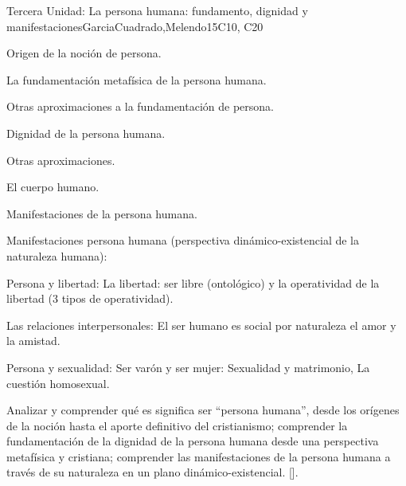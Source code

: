 \begin{syllabus}
\begin{unit}{}{Tercera Unidad: La persona humana: fundamento, dignidad y manifestaciones}{GarciaCuadrado,Melendo}{15}{C10, C20}
\begin{topics}
	\item Origen de la noción de persona.
	\item La fundamentación metafísica de la persona humana.
	\item Otras aproximaciones a la fundamentación de persona.
	\item Dignidad de la persona humana.
		\begin{subtopics}
			\item Otras aproximaciones.
		\end{subtopics}
	\item El cuerpo humano.
	\item Manifestaciones de la persona humana.
	\item Manifestaciones persona humana (perspectiva dinámico-existencial de la naturaleza humana):
		\begin{subtopics}
			\item Persona y libertad:  La libertad: ser libre (ontológico) y la operatividad de la libertad (3 tipos de operatividad).
			\item Las relaciones interpersonales: El ser humano es social por naturaleza el amor y la amistad.
			\item Persona y sexualidad: Ser varón y ser mujer: Sexualidad y matrimonio, La cuestión homosexual.
		\end{subtopics}
\end{topics}
\begin{learningoutcomes}
	\item Analizar y comprender qué es significa ser ``persona humana'', desde los orígenes de la noción hasta el aporte definitivo del cristianismo; comprender la fundamentación de la dignidad de la persona humana desde una perspectiva metafísica y cristiana; comprender las manifestaciones de la persona humana a través de su naturaleza en un plano dinámico-existencial. [\Usage].
\end{learningoutcomes}
\end{unit}


\end{syllabus}
